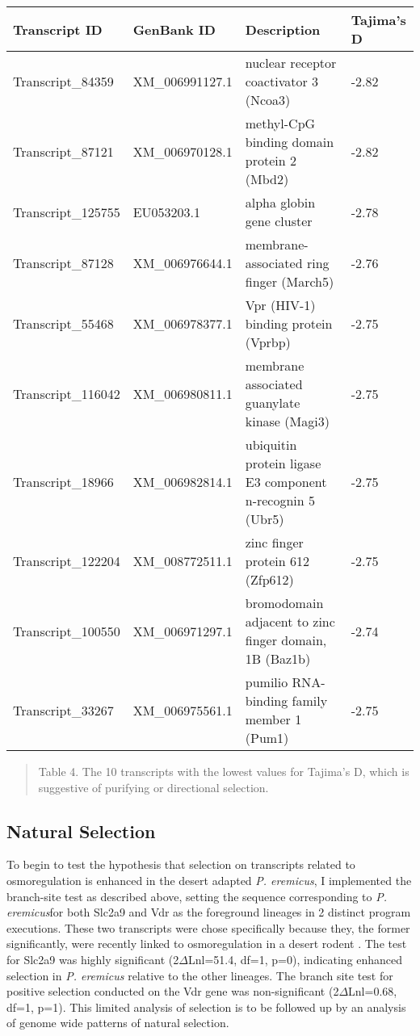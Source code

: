 \documentclass[11pt]{article}
\newcommand{\peer}{\textit{P. eremicus}}
\begin{document}
\begin{center}
\begin{adjustwidth}{-.75in}{-.75in}%
\begin{tabular}{ l l l l }
\textbf{Transcript ID} & \textbf{GenBank ID} & \textbf{Description} & \textbf{Tajima's D} \\
\hline
Transcript\_84359 & XM\_006991127.1 & nuclear receptor coactivator 3 (Ncoa3) & -2.82\\
Transcript\_87121 & XM\_006970128.1 & methyl-CpG binding domain protein 2 (Mbd2) & -2.82 \\
Transcript\_125755 & EU053203.1 & alpha globin gene cluster & -2.78\\
Transcript\_87128 & XM\_006976644.1 & membrane-associated ring finger (March5) & -2.76 \\
Transcript\_55468 & XM\_006978377.1 & Vpr (HIV-1) binding protein (Vprbp) & -2.75\\
Transcript\_116042 & XM\_006980811.1 & membrane associated guanylate kinase (Magi3) & -2.75  \\
Transcript\_18966 & XM\_006982814.1 & ubiquitin protein ligase E3 component n-recognin 5 (Ubr5) & -2.75 \\
Transcript\_122204 & XM\_008772511.1 & zinc finger protein 612 (Zfp612) & -2.75 \\
Transcript\_100550 & XM\_006971297.1 & bromodomain adjacent to zinc finger domain, 1B (Baz1b) & -2.74\\
Transcript\_33267 & XM\_006975561.1 & pumilio RNA-binding family member 1 (Pum1) & -2.75\\
 \end{tabular}
\begin{quote}
\small{Table 4. The 10 transcripts with the lowest values for Tajima's D, which is suggestive of purifying or directional selection.}
\end{quote}  
\end{adjustwidth}
\end{center}

\subsection*{Natural Selection}

To begin to test the hypothesis that selection on transcripts related to osmoregulation is enhanced in the desert adapted \peer, I implemented the branch-site test as described above, setting the sequence corresponding to \peer\:for both Slc2a9 and Vdr as the foreground lineages in 2 distinct program executions. These two transcripts were chose specifically because they, the former significantly, were recently linked to osmoregulation in a desert rodent \cite{Marra:2014de}. The test for Slc2a9 was highly significant (2$\Delta$Lnl=51.4, df=1, p=0), indicating enhanced selection in \peer\: relative to the other lineages. The branch site test for positive selection conducted on the Vdr gene was non-significant (2$\Delta$Lnl=0.68, df=1, p=1). This limited analysis of selection is to be followed up by an analysis of genome wide patterns of natural selection. \\
\end{document}
